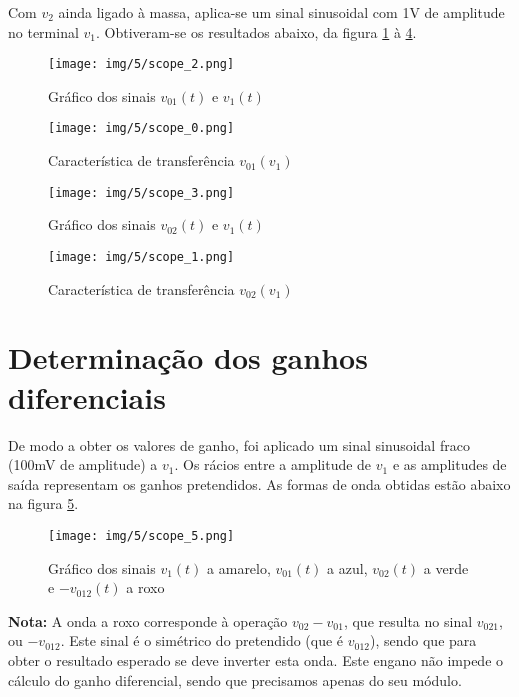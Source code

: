 \documentclass[a4paper,2pt]{report}
\begin{document}
\par Com \(v_2\) ainda ligado à massa, aplica-se um sinal sinusoidal com 1V de amplitude no terminal \(v_1\). Obtiveram-se os resultados abaixo, da figura \ref{5_2_1} à \ref{5_2_4}.

\begin{figure}[H]
    \centering
    \texttt{[image: img/5/scope\_2.png]}
    \caption{Gráfico dos sinais \(v_{01}(t)\) e \(v_1(t)\)}
    \label{5_2_1}
\end{figure}
\begin{figure}[H]
    \centering
    \texttt{[image: img/5/scope\_0.png]}
    \caption{Característica de transferência \(v_{01}(v_1)\)}
    \label{5_2_2}
\end{figure}
\begin{figure}[H]
    \centering
    \texttt{[image: img/5/scope\_3.png]}
    \caption{Gráfico dos sinais \(v_{02}(t)\) e \(v_1(t)\)}
    \label{5_2_3}
\end{figure}
\begin{figure}[H]
    \centering
    \texttt{[image: img/5/scope\_1.png]}
    \caption{Característica de transferência \(v_{02}(v_1)\)}
    \label{5_2_4}
\end{figure}

\section{Determinação dos ganhos diferenciais}

\par De modo a obter os valores de ganho, foi aplicado um sinal sinusoidal fraco (100mV de amplitude) a \(v_1\). Os rácios entre a amplitude de \(v_1\) e as amplitudes de saída representam os ganhos pretendidos. As formas de onda obtidas estão abaixo na figura \ref{5_3}.

\begin{figure}[H]
    \centering
    \texttt{[image: img/5/scope\_5.png]}
    \caption{Gráfico dos sinais \(v_1(t)\) a amarelo, \(v_{01}(t)\) a azul, \(v_{02}(t)\) a verde e \(-v_{012}(t)\) a roxo}
    \label{5_3}
\end{figure}

\par \textbf{Nota:} A onda a roxo corresponde à operação \(v_{02} - v_{01}\), que resulta no sinal \(v_{021}\), ou \(-v_{012}\). Este sinal é o simétrico do pretendido (que é \(v_{012}\)), sendo que para obter o resultado esperado se deve inverter esta onda. Este engano não impede o cálculo do ganho diferencial, sendo que precisamos apenas do seu módulo.
\end{document}
